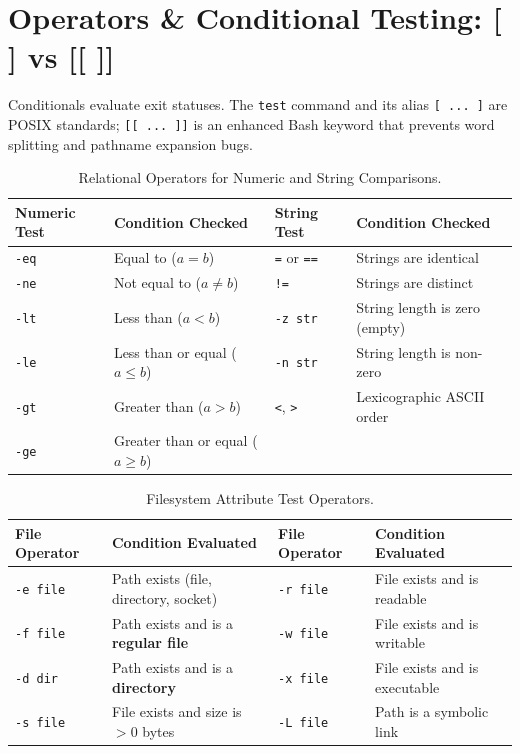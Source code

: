 \section{Operators \& Conditional Testing: [ ] vs [[ ]]}
Conditionals evaluate exit statuses. The \texttt{test} command and its alias \texttt{[ ... ]} are POSIX standards; \texttt{[[ ... ]]} is an enhanced Bash keyword that prevents word splitting and pathname expansion bugs.

\begin{table}[htbp]
\centering
\small
\begin{tabularx}{\linewidth}{l X l X}
\toprule
\textbf{Numeric Test} & \textbf{Condition Checked} & \textbf{String Test} & \textbf{Condition Checked} \\
\midrule
\texttt{-eq} & Equal to ($a = b$) & \texttt{=} or \texttt{==} & Strings are identical \\
\texttt{-ne} & Not equal to ($a \neq b$) & \texttt{!=} & Strings are distinct \\
\texttt{-lt} & Less than ($a < b$) & \texttt{-z str} & String length is zero (empty) \\
\texttt{-le} & Less than or equal ($a \le b$) & \texttt{-n str} & String length is non-zero \\
\texttt{-gt} & Greater than ($a > b$) & \texttt{<}, \texttt{>} & Lexicographic ASCII order \\
\texttt{-ge} & Greater than or equal ($a \ge b$) & & \\
\bottomrule
\end{tabularx}
\caption{Relational Operators for Numeric and String Comparisons.}
\label{tab:rel-ops}
\end{table}

\begin{table}[htbp]
\centering
\small
\begin{tabularx}{\linewidth}{l X l X}
\toprule
\textbf{File Operator} & \textbf{Condition Evaluated} & \textbf{File Operator} & \textbf{Condition Evaluated} \\
\midrule
\texttt{-e file} & Path exists (file, directory, socket) & \texttt{-r file} & File exists and is readable \\
\texttt{-f file} & Path exists and is a \textbf{regular file} & \texttt{-w file} & File exists and is writable \\
\texttt{-d dir} & Path exists and is a \textbf{directory} & \texttt{-x file} & File exists and is executable \\
\texttt{-s file} & File exists and size is $> 0$ bytes & \texttt{-L file} & Path is a symbolic link \\
\bottomrule
\end{tabularx}
\caption{Filesystem Attribute Test Operators.}
\label{tab:file-ops}
\end{table}

